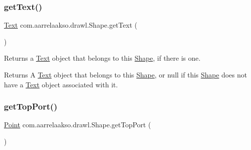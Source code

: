 \mbox{\label{classcom_1_1aarrelaakso_1_1drawl_1_1_shape_a6f876978d4102974fedc5b41c93c7b26}} 
\subsubsection{\texorpdfstring{get\+Text()}{getText()}}
{\footnotesize\ttfamily \hyperlink{classcom_1_1aarrelaakso_1_1drawl_1_1_text}{Text} com.\+aarrelaakso.\+drawl.\+Shape.\+get\+Text (\begin{DoxyParamCaption}{ }\end{DoxyParamCaption})\hspace{0.3cm}{\ttfamily [inherited]}}



Returns a \hyperlink{classcom_1_1aarrelaakso_1_1drawl_1_1_text}{Text} object that belongs to this \hyperlink{classcom_1_1aarrelaakso_1_1drawl_1_1_shape}{Shape}, if there is one. 

\begin{DoxyReturn}{Returns}
A \hyperlink{classcom_1_1aarrelaakso_1_1drawl_1_1_text}{Text} object that belongs to this \hyperlink{classcom_1_1aarrelaakso_1_1drawl_1_1_shape}{Shape}, or {\ttfamily null} if this \hyperlink{classcom_1_1aarrelaakso_1_1drawl_1_1_shape}{Shape} does not have a \hyperlink{classcom_1_1aarrelaakso_1_1drawl_1_1_text}{Text} object associated with it. 
\end{DoxyReturn}
\mbox{\label{classcom_1_1aarrelaakso_1_1drawl_1_1_shape_aed4e9caa294aacc973b7a531a960e9e5}} 
\subsubsection{\texorpdfstring{get\+Top\+Port()}{getTopPort()}}
{\footnotesize\ttfamily \hyperlink{classcom_1_1aarrelaakso_1_1drawl_1_1_point}{Point} com.\+aarrelaakso.\+drawl.\+Shape.\+get\+Top\+Port (\begin{DoxyParamCaption}{ }\end{DoxyParamCaption})\hspace{0.3cm}{\ttfamily [inherited]}}



